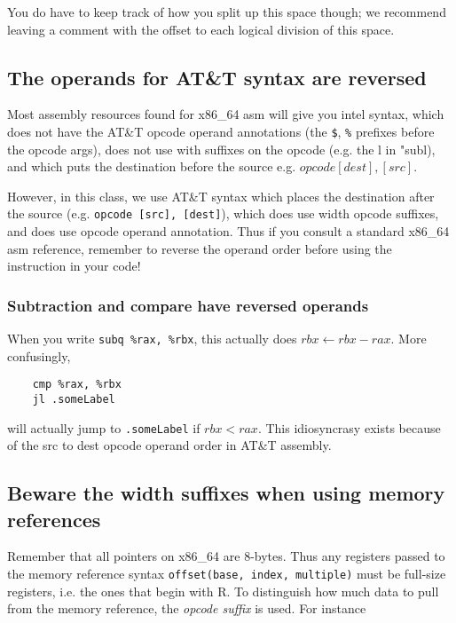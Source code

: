 \documentclass[11pt]{article}
\begin{document}
You do have to keep track of how you split up this space though; we recommend leaving a
comment with the offset to each logical division of this space.

\subsection{The operands for AT\&T syntax are reversed}

Most assembly resources found for x86\_64 asm will give you intel syntax, which does not
have the AT\&T opcode operand annotations (the \texttt{\$}, \texttt{\%} prefixes before the
opcode args), does not use with suffixes on the opcode (e.g. the l in "subl),
and which puts the destination before the source e.g. $opcode [dest], [src]$.

However, in this class, we use AT\&T syntax which places the destination after the source
(e.g. \texttt{opcode [src], [dest]}), which does use width opcode suffixes, and does use opcode
operand annotation. Thus if you consult a standard x86\_64 asm reference, remember to
reverse the operand order before using the instruction in your code!

\subsubsection{Subtraction and compare have reversed operands}

When you write \texttt{subq \%rax, \%rbx}, this actually does $rbx \leftarrow rbx - rax$. More
confusingly,

\begin{lstlisting}
    cmp %rax, %rbx
    jl .someLabel
\end{lstlisting}

will actually jump to \texttt{.someLabel} if $rbx < rax$. This idiosyncrasy exists because
of the src to dest opcode operand order in AT\&T assembly.

\subsection{Beware the width suffixes when using memory references}

Remember that all pointers on x86\_64 are 8-bytes. Thus any registers passed to the memory
reference syntax \texttt{offset(base, index, multiple)} must be full-size registers, i.e.
the ones that begin with R. To distinguish how much data to pull from the memory
reference, the \emph{opcode suffix} is used. For instance
\end{document}
